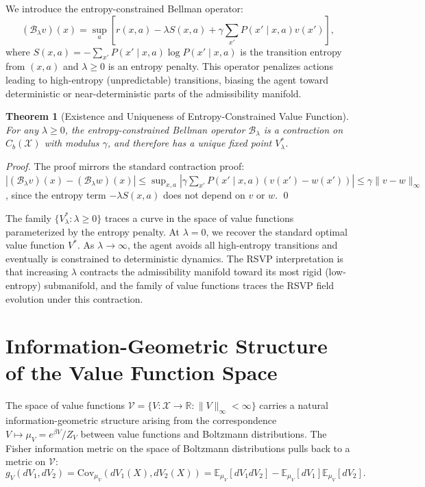 \documentclass[12pt, a4paper, openany]{book}
\theoremstyle{plain}
\newtheorem{theorem}{Theorem}[chapter]
\theoremstyle{definition}
\theoremstyle{remark}
\newcommand{\Sfield}{S}
\newcommand{\BellmanOp}{\mathcal{B}}
\begin{document}
We introduce the entropy-constrained Bellman operator:
\[
(\BellmanOp_\lambda v)(x) = \sup_a\!\left[r(x,a) - \lambda \Sfield(x,a) + \gamma \sum_{x'} P(x' \mid x,a) v(x')\right],
\]
where $\Sfield(x,a) = -\sum_{x'} P(x' \mid x,a) \log P(x' \mid x,a)$ is the transition entropy from $(x,a)$ and $\lambda \geq 0$ is an entropy penalty. This operator penalizes actions leading to high-entropy (unpredictable) transitions, biasing the agent toward deterministic or near-deterministic parts of the admissibility manifold.

\begin{theorem}[Existence and Uniqueness of Entropy-Constrained Value Function]
For any $\lambda \geq 0$, the entropy-constrained Bellman operator $\BellmanOp_\lambda$ is a contraction on $C_b(\mathcal{X})$ with modulus $\gamma$, and therefore has a unique fixed point $V_\lambda^*$.
\end{theorem}

\begin{proof}
The proof mirrors the standard contraction proof: $|(\BellmanOp_\lambda v)(x) - (\BellmanOp_\lambda w)(x)| \leq \sup_{x,a} |\gamma \sum_{x'} P(x' \mid x,a)(v(x') - w(x'))| \leq \gamma \|v - w\|_\infty$, since the entropy term $-\lambda \Sfield(x,a)$ does not depend on $v$ or $w$. \qed
\end{proof}

The family $\{V_\lambda^* : \lambda \geq 0\}$ traces a curve in the space of value functions parameterized by the entropy penalty. At $\lambda = 0$, we recover the standard optimal value function $V^*$. As $\lambda \to \infty$, the agent avoids all high-entropy transitions and eventually is constrained to deterministic dynamics. The RSVP interpretation is that increasing $\lambda$ contracts the admissibility manifold toward its most rigid (low-entropy) submanifold, and the family of value functions traces the RSVP field evolution under this contraction.

\section{Information-Geometric Structure of the Value Function Space}

The space of value functions $\mathcal{V} = \{V: \mathcal{X} \to \mathbb{R} : \|V\|_\infty < \infty\}$ carries a natural information-geometric structure arising from the correspondence $V \mapsto \mu_V = e^{\beta V} / Z_V$ between value functions and Boltzmann distributions. The Fisher information metric on the space of Boltzmann distributions pulls back to a metric on $\mathcal{V}$:
\[
g_V(dV_1, dV_2) = \mathrm{Cov}_{\mu_V}(dV_1(X), dV_2(X)) = \mathbb{E}_{\mu_V}[dV_1 dV_2] - \mathbb{E}_{\mu_V}[dV_1]\mathbb{E}_{\mu_V}[dV_2].
\]
\end{document}
